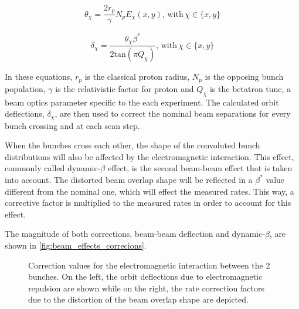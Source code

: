 \begin{equation}
	\theta_{\chi} = \frac{2r_p}{\gamma} N_p E_{\chi}(x, y), \, \mathrm{with} \, \chi \in \{ x, y \}
	\label{eq:beam_deflection_angle}
\end{equation}

\begin{equation}
	\delta_{\chi} = \frac{\theta_{\chi} \beta^{*}}{2 \mathrm{tan} \left( \pi Q_{\chi} \right)}, \, \mathrm{with} \, \chi \in \{ x, y \}
	\label{eq:beam_orbit_deflection}
\end{equation}

In these equations, $r_p$ is the classical proton radius, $N_p$ is the opposing bunch population, $\gamma$ is the relativistic factor for proton and $Q_{\chi}$ is the betatron tune, a beam optics parameter specific to the each experiment. The calculated orbit deflections, $\delta_{\chi}$, are then used to correct the nominal beam separations for every bunch crossing and at each scan step.

When the bunches cross each other, the shape of the convoluted bunch distributions will also be affected by the electromagnetic interaction. This effect, commonly called dynamic-$\beta$ effect, is the second beam-beam effect that is taken into account. The distorted beam overlap shape will be reflected in a $\beta^{*}$ value different from the nominal one, which will effect the measured rates. This way, a corrective factor is multiplied to the measured rates in order to account for this effect.

The magnitude of both corrections, beam-beam deflection and dynamic-$\beta$, are shown in \autoref{fig:beam_effects_correcions}.

\begin{figure}[!htb]
	\centering
	\caption[Electromagnetic interaction correction]{Correction values for the electromagnetic interaction between the 2 bunches. On the left, the orbit deflections due to electromagnetic repulsion are shown while on the right, the rate correction factors due to the distortion of the beam overlap shape are depicted.}
	\label{fig:beam_effects_correcions}
\end{figure}

